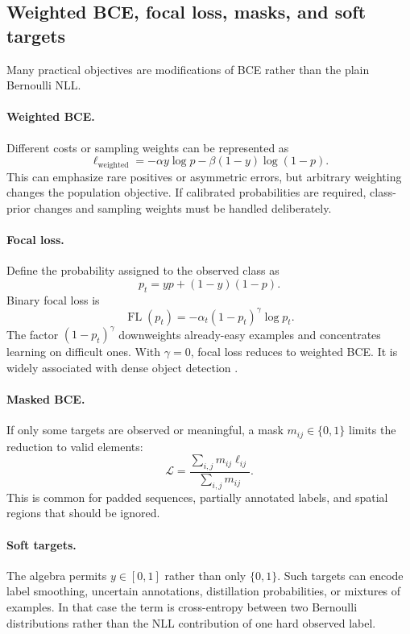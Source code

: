\documentclass[11pt]{article}
\theoremstyle{definition}
\begin{document}
\subsection{Weighted BCE, focal loss, masks, and soft targets}

Many practical objectives are modifications of BCE rather than the plain Bernoulli NLL.

\paragraph{Weighted BCE.}
Different costs or sampling weights can be represented as
\begin{equation}
\ell_{\mathrm{weighted}}
=-\alpha y\log p-\beta(1-y)\log(1-p).
\label{eq:appendix-weighted-bce}
\end{equation}
This can emphasize rare positives or asymmetric errors, but arbitrary weighting changes the population objective. If calibrated probabilities are required, class-prior changes and sampling weights must be handled deliberately.

\paragraph{Focal loss.}
Define the probability assigned to the observed class as
\[
p_t=yp+(1-y)(1-p).
\]
Binary focal loss is
\begin{equation}
\operatorname{FL}(p_t)
=-\alpha_t(1-p_t)^\gamma\log p_t.
\label{eq:focal-loss}
\end{equation}
The factor $(1-p_t)^\gamma$ downweights already-easy examples and concentrates learning on difficult ones. With $\gamma=0$, focal loss reduces to weighted BCE. It is widely associated with dense object detection \cite{lin2017}.

\paragraph{Masked BCE.}
If only some targets are observed or meaningful, a mask $m_{ij}\in\{0,1\}$ limits the reduction to valid elements:
\[
\mathcal L
=\frac{\sum_{i,j}m_{ij}\ell_{ij}}
{\sum_{i,j}m_{ij}}.
\]
This is common for padded sequences, partially annotated labels, and spatial regions that should be ignored.

\paragraph{Soft targets.}
The algebra permits $y\in[0,1]$ rather than only $\{0,1\}$. Such targets can encode label smoothing, uncertain annotations, distillation probabilities, or mixtures of examples. In that case the term is cross-entropy between two Bernoulli distributions rather than the NLL contribution of one hard observed label.
\end{document}

